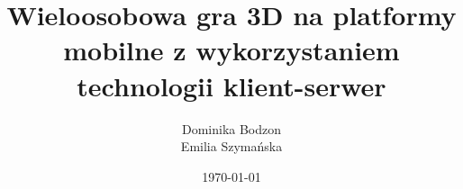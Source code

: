 \documentclass{mini}
\title{Wieloosobowa gra 3D na platformy mobilne z wykorzystaniem technologii klient-serwer}
\author{Dominika Bodzon\\Emilia Szyma{\'n}ska}
\date{\today}
\begin{document}
\maketitle




\tableofcontents












\makestatement
\end{document}
